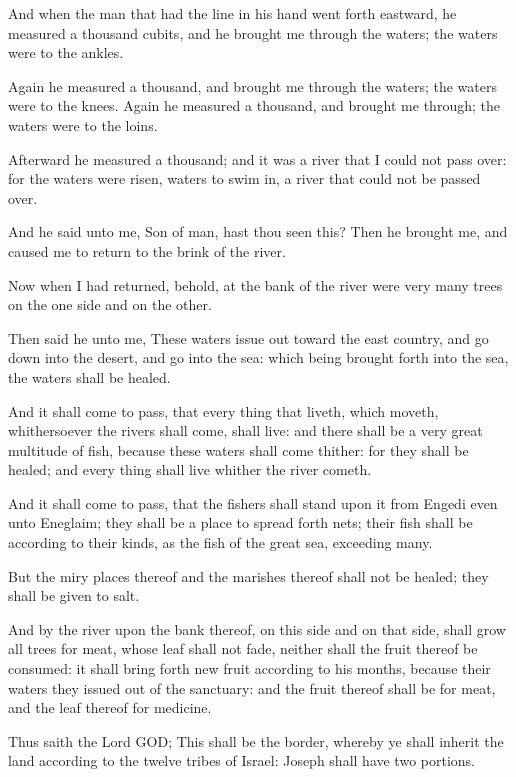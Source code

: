 \Verse And when the man that had the line in his hand went forth eastward, he measured a thousand cubits, and he brought me through the waters; the waters were to the ankles.

\Verse Again he measured a thousand, and brought me through the waters; the waters were to the knees. Again he measured a thousand, and brought me through; the waters were to the loins.

\Verse Afterward he measured a thousand; and it was a river that I could not pass over: for the waters were risen, waters to swim in, a river that could not be passed over.

\Verse And he said unto me, Son of man, hast thou seen this? Then he brought me, and caused me to return to the brink of the river.

\Verse Now when I had returned, behold, at the bank of the river were very many trees on the one side and on the other.

\Verse Then said he unto me, These waters issue out toward the east country, and go down into the desert, and go into the sea: which being brought forth into the sea, the waters shall be healed.

\Verse And it shall come to pass, that every thing that liveth, which moveth, whithersoever the rivers shall come, shall live: and there shall be a very great multitude of fish, because these waters shall come thither: for they shall be healed; and every thing shall live whither the river cometh.

\Verse And it shall come to pass, that the fishers shall stand upon it from Engedi even unto Eneglaim; they shall be a place to spread forth nets; their fish shall be according to their kinds, as the fish of the great sea, exceeding many.

\Verse But the miry places thereof and the marishes thereof shall not be healed; they shall be given to salt.

\Verse And by the river upon the bank thereof, on this side and on that side, shall grow all trees for meat, whose leaf shall not fade, neither shall the fruit thereof be consumed: it shall bring forth new fruit according to his months, because their waters they issued out of the sanctuary: and the fruit thereof shall be for meat, and the leaf thereof for medicine.

\Verse Thus saith the Lord GOD; This shall be the border, whereby ye shall inherit the land according to the twelve tribes of Israel: Joseph shall have two portions.

